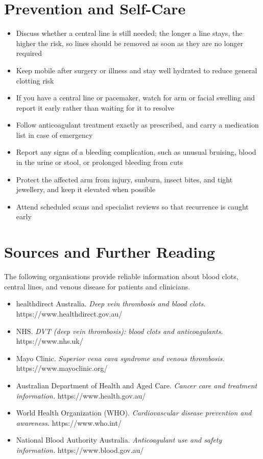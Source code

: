 \section*{Prevention and Self-Care}
\begin{itemize}
    \item Discuss whether a central line is still needed; the longer a line stays, the higher the risk, so lines should be removed as soon as they are no longer required
    \item Keep mobile after surgery or illness and stay well hydrated to reduce general clotting risk
    \item If you have a central line or pacemaker, watch for arm or facial swelling and report it early rather than waiting for it to resolve
    \item Follow anticoagulant treatment exactly as prescribed, and carry a medication list in case of emergency
    \item Report any signs of a bleeding complication, such as unusual bruising, blood in the urine or stool, or prolonged bleeding from cuts
    \item Protect the affected arm from injury, sunburn, insect bites, and tight jewellery, and keep it elevated when possible
    \item Attend scheduled scans and specialist reviews so that recurrence is caught early
\end{itemize}

\section*{Sources and Further Reading}
The following organisations provide reliable information about blood clots, central lines, and venous disease for patients and clinicians.

\begin{itemize}
    \item healthdirect Australia. \textit{Deep vein thrombosis and blood clots.} https://www.healthdirect.gov.au/
    \item NHS. \textit{DVT (deep vein thrombosis): blood clots and anticoagulants.} https://www.nhs.uk/
    \item Mayo Clinic. \textit{Superior vena cava syndrome and venous thrombosis.} https://www.mayoclinic.org/
    \item Australian Department of Health and Aged Care. \textit{Cancer care and treatment information.} https://www.health.gov.au/
    \item World Health Organization (WHO). \textit{Cardiovascular disease prevention and awareness.} https://www.who.int/
    \item National Blood Authority Australia. \textit{Anticoagulant use and safety information.} https://www.blood.gov.au/
\end{itemize}

\clearpage
